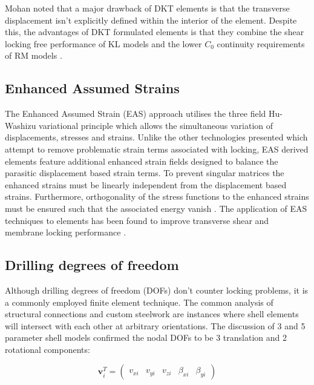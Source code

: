 Mohan \cite{Mohan97} noted that a major drawback of DKT elements is that the transverse displacement isn't explicitly defined within the interior of the element. Despite this, the advantages of DKT formulated elements is that they combine the shear locking free performance of KL models and the lower $C_0$ continuity requirements of RM models \cite{Bletz16}.

\subsection{Enhanced Assumed Strains}

The Enhanced Assumed Strain (EAS) approach \cite{Simo1990} utilises the three field Hu-Washizu variational principle which allows the simultaneous variation of displacements, stresses and strains. Unlike the other technologies presented which attempt to remove problematic strain terms associated with locking, EAS derived elements feature additional enhanced strain fields designed to balance the parasitic displacement based strain terms. To prevent singular matrices the enhanced strains must be linearly independent from the displacement based strains. Furthermore, orthogonality of the stress functions to the enhanced strains must be ensured such that the associated energy vanish \cite{Echter13}. The application of EAS techniques to elements has been found to improve transverse shear and membrane locking performance \cite{Simo1990} \cite{BischLitBook04} \cite{Echter13}.

\subsection{Drilling degrees of freedom} \label{drilling_DOF_section}

Although drilling degrees of freedom (DOFs) don't counter locking problems, it is a commonly employed finite element technique. The common analysis of structural connections and custom steelwork are instances where shell elements will intersect with each other at arbitrary orientations. The discussion of 3 and 5 parameter shell models confirmed the nodal DOFs to be 3 translation and 2 rotational components:

\begin{equation} 
\mathbf{v}_i^T = \begin{pmatrix}
v_{xi} & v_{yi} & v_{zi} & \beta_{xi} & \beta_{yi}
\end{pmatrix}
\label{eqsdrilling}
\end{equation}

